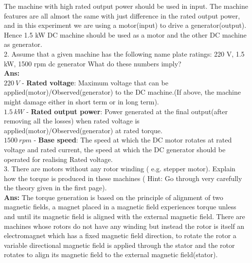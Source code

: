 \documentclass[12pt]{article}
\begin{document}
    The machine with high rated output power should be used in input. The machine features are all almost the same with just difference in the rated output power, and in this experiment we are using a motor(input) to drive a generator(output). Hence 1.5 kW DC machine should be used as a motor and the other DC machine as generator.
    \vspace{0.1cm}\\
    2. Assume that a given machine has the following name plate ratings: 220 V, 1.5 kW, 1500 rpm dc generator What do these numbers imply?\vspace{0.1cm}\\
    \textbf{Ans:}\\
        $220\ V$ - \textbf{Rated voltage}: Maximum voltage that can be applied(motor)/Observed(generator) to the DC machine.(If above, the machine might damage either in short term or in long term).\\%
        $1.5\ kW$ - \textbf{Rated output power}: Power generated at the final output(after removing all the losses) when rated voltage is applied(motor)/Observed(generator) at rated torque.\\%
        $1500\ rpm$ - \textbf{Base speed}: The speed at which the DC motor rotates at rated voltage and rated current, the speed at which the DC generator should be operated for realising Rated voltage.%
    \vspace{0.1cm}\\
    3. There are motors without any rotor winding ( e.g. stepper motor). Explain how the torque is produced in these machines ( Hint: Go through very carefully the theory given in the first page).\vspace{0.1cm}\\
    \textbf{Ans:} The torque generation is based on the principle of alignment of two magnetic fields, a magnet placed in a magnetic field experiences torque unless and until its magnetic field is aligned with the external magnetic field.
    There are machines whose rotors do not have any winding but instead the rotor is itself an electromagnet which has a fixed magnetic field direction, to rotate the rotor a variable directional magnetic field is applied through the stator and the rotor rotates to align its magnetic field to the external magnetic field(stator).
    \vspace{0.1cm}\\
\end{document}
